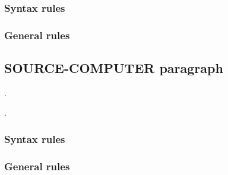 \subsubsection{Syntax rules}

\subsubsection{General rules}

\subsection{SOURCE-COMPUTER paragraph}

\begin{syntax}
  .
  \begin{0-1}
    \begin{1=}
      \computername
    \end{1=}\gnucobol{\ldots}
    .
  \end{0-1}
\end{syntax}

\subsubsection{Syntax rules}

\subsubsection{General rules}


